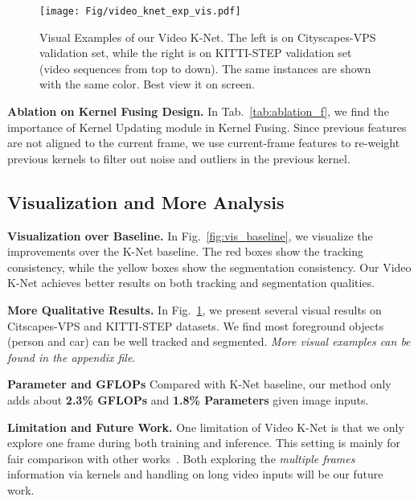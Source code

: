\begin{figure}[!t]
	\centering
	\texttt{[image: Fig/video\_knet\_exp\_vis.pdf]}
	\caption{\small Visual Examples of our Video K-Net. The left is on Cityscapes-VPS validation set, while the right is on KITTI-STEP validation set (video sequences from top to down). The same instances are shown with the same color. Best view it on screen. }
	\label{fig:results_vis}
\end{figure}

\noindent
\textbf{Ablation on Kernel Fusing Design.} In Tab.~\ref{tab:ablation_f}, we find the importance of Kernel Updating module in Kernel Fusing. Since previous features are not aligned to the current frame, we use current-frame features to re-weight previous kernels to filter out noise and outliers in the previous kernel.

\subsection{Visualization and More Analysis}

\noindent
\textbf{Visualization over Baseline.} In Fig.~\ref{fig:vis_baseline}, we visualize the improvements over the K-Net baseline. The red boxes show the tracking consistency, while the yellow boxes show the segmentation consistency. Our Video K-Net achieves better results on both tracking and segmentation qualities.

\noindent
\textbf{More Qualitative Results.} In Fig.~\ref{fig:results_vis}, we present several visual results on Citscapes-VPS and KITTI-STEP datasets. We find most foreground objects (person and car) can be well tracked and segmented. \textit{More visual examples can be found in the appendix file}.

\noindent
\textbf{Parameter and GFLOPs} Compared with K-Net baseline, our method only adds about \textbf{2.3\% GFLOPs} and \textbf{1.8\% Parameters} given  image inputs. 

\noindent
\textbf{Limitation and Future Work.} One limitation of Video K-Net is that we only explore one frame during both training and inference. This setting is mainly for fair comparison with other works~\cite{STEP,kim2020vps}. Both exploring the \textit{multiple frames} information via kernels and handling on long video inputs will be our future work.